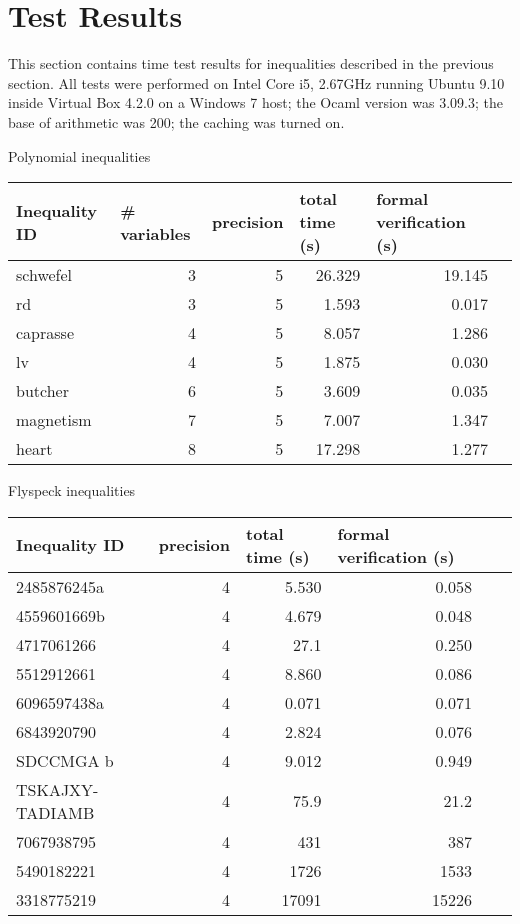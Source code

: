 \documentclass[a4paper]{article}
\begin{document}
\section{Test Results}
This section contains time test results for inequalities described in the previous section. All tests were performed on Intel Core i5, 2.67GHz running Ubuntu 9.10 inside Virtual Box 4.2.0 on a Windows 7 host; the Ocaml version was 3.09.3; the base of arithmetic was 200; the caching was turned on.

\begin{center}
Polynomial inequalities

\begin{tabular}{l@{\quad} r r r r r}
\hline
\multicolumn{1}{l}{\rule{0pt}{12pt}Inequality ID}&
\multicolumn{1}{l}{\phantom{x}\# variables}&
\multicolumn{1}{l}{\phantom{x}precision}&
\multicolumn{1}{l}{\phantom{x}total time (s)}&
\multicolumn{1}{l}{\phantom{x}formal verification (s)}\\
\hline\rule{0pt}{12pt}%
schwefel	& 3	& 5		& 26.329 &	19.145 \\
rd			& 3 & 5		& 1.593 &	0.017 \\
caprasse	& 4 & 5		& 8.057	&	1.286 \\
lv			& 4	& 5		& 1.875 &	0.030 \\
butcher		& 6 & 5		& 3.609 &	0.035 \\
magnetism	& 7 & 5		& 7.007 &	1.347 \\
heart		& 8 & 5		& 17.298 &	1.277 \\
\hline
\end{tabular}
\end{center}

\begin{center}
Flyspeck inequalities

\begin{tabular}{l@{\quad} r r r r r}
\hline
\multicolumn{1}{l}{\rule{0pt}{12pt}Inequality ID}&
\multicolumn{1}{l}{\phantom{x}precision}&
\multicolumn{1}{l}{\phantom{x}total time (s)}&
\multicolumn{1}{l}{\phantom{x}formal verification (s)}\\
\hline\rule{0pt}{12pt}%
2485876245a	& 4 & 5.530 & 0.058 \\
4559601669b & 4 & 4.679 & 0.048 \\
4717061266  & 4 & 27.1 & 0.250 \\
5512912661  & 4 & 8.860 & 0.086 \\
6096597438a & 4 & 0.071 & 0.071 \\
6843920790  & 4 & 2.824 & 0.076 \\
SDCCMGA b   & 4 & 9.012 & 0.949 \\
TSKAJXY-TADIAMB\footnotemark[1] & 4 & 75.9 & 21.2 \\
7067938795  & 4 & 431   & 387 \\
5490182221  & 4 & 1726  & 1533 \\
3318775219  & 4 & 17091 & 15226 \\
\hline
\end{tabular}
\end{center}
\end{document}
